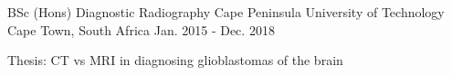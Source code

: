 

\begin{cventries}

  \cventry
    {BSc (Hons) Diagnostic Radiography} %
    {Cape Peninsula University of Technology} %
    {Cape Town, South Africa} %
    {Jan. 2015 - Dec. 2018} %
    {
      \begin{cvitems} %
        \item {Thesis: CT vs MRI in diagnosing glioblastomas of the brain}
      \end{cvitems}
    }

\end{cventries}
